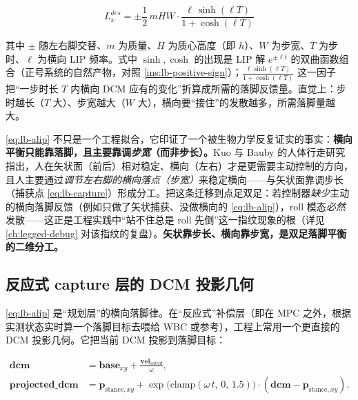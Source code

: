 \begin{equation}
  \boxed{\;L_x^{des}=\pm\frac{1}{2}\,mHW\cdot\frac{\ell\,\sinh(\ell T)}{1+\cosh(\ell T)}\;}
  \label{eq:lb-alip}
\end{equation}

其中 $\pm$ 随左右脚交替、$m$ 为质量、$H$ 为质心高度（即 $h$）、$W$ 为步宽、$T$ 为步时、$\ell$ 为横向 LIP 频率。式中 $\sinh,\cosh$ 的出现是 LIP 解 $e^{\pm\ell t}$ 的双曲函数组合（正号系统的自然产物，对照 \cref{ins:lb-positive-sign}）；$\frac{\ell\sinh(\ell T)}{1+\cosh(\ell T)}$ 这一因子把“一步时长 $T$ 内横向 DCM 应有的变化”折算成所需的落脚反馈量。直觉上：步时越长（$T$ 大）、步宽越大（$W$ 大），横向要“接住”的发散越多，所需落脚量越大。

\begin{insight}\label{ins:lb-lateral-must}
\cref{eq:lb-alip} 不只是一个工程拟合，它印证了一个被生物力学反复证实的事实：\textbf{横向平衡只能靠落脚，且主要靠调\emph{步宽}（而非步长）。}Kuo 与 Bauby 的人体行走研究\cite{kuo1999stabilization} 指出，人在矢状面（前后）相对稳定、横向（左右）才是更需要主动控制的方向，且人主要通过\emph{调节左右脚的横向落点（步宽）}来稳定横向——与矢状面靠调步长（捕获点 \cref{eq:lb-capture}）形成分工。把这条迁移到点足双足：若控制器\emph{缺少}主动的横向落脚反馈（例如只做了矢状捕获、没做横向的 \cref{eq:lb-alip}），roll 模态\emph{必然}发散——这正是工程实践中“站不住总是 roll 先倒”这一指纹现象的根（详见 \cref{ch:legged-debug} 对该指纹的复盘）。\textbf{矢状靠步长、横向靠步宽，是双足落脚平衡的二维分工。}
\end{insight}

\subsection{反应式 capture 层的 DCM 投影几何}
\label{subsec:lb-dcm-proj}

\cref{eq:lb-alip} 是“规划层”的横向落脚律。在“反应式”补偿层（即在 MPC 之外，根据实测状态实时算一个落脚目标去喂给 WBC 或参考），工程上常用一个更直接的 DCM 投影几何。它把当前 DCM 投影到落脚目标：

\begin{align}
  \mathbf{dcm}&=\mathbf{base}_{xy}+\frac{\mathbf{vel}_{world}}{\omega},\label{eq:lb-dcm-proj1}\\
  \mathbf{projected\_dcm}&=\mathbf{p}_{\mathrm{stance},xy}+\exp\!\big(\mathrm{clamp}(\omega\,t,\,0,\,1.5)\big)\cdot(\mathbf{dcm}-\mathbf{p}_{\mathrm{stance},xy}).\label{eq:lb-dcm-proj2}
\end{align}


